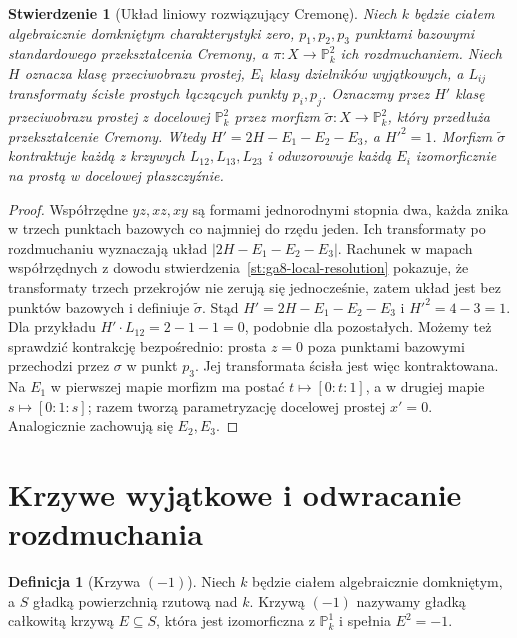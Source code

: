 \documentclass[11pt,a4paper,openany]{report}
\numberwithin{equation}{section}
\theoremstyle{plain}
\newtheorem{stwierdzenie}[twierdzenie]{Stwierdzenie}
\theoremstyle{definition}
\newtheorem{definicja}[twierdzenie]{Definicja}
\theoremstyle{remark}
\newcommand{\PP}{\mathbb P}
\begin{document}
\begin{stwierdzenie}[Układ liniowy rozwiązujący Cremonę]
\label{st:ga8-cremona-linear}
Niech $k$ będzie ciałem algebraicznie domkniętym
charakterystyki zero, $p_1,p_2,p_3$ punktami bazowymi
standardowego przekształcenia Cremony, a
$\pi:X\to\PP^2_k$ ich rozdmuchaniem. Niech $H$ oznacza
klasę przeciwobrazu prostej, $E_i$ klasy dzielników
wyjątkowych, a $L_{ij}$ transformaty ścisłe prostych
łączących punkty $p_i,p_j$. Oznaczmy przez $H'$ klasę
przeciwobrazu prostej z docelowej $\PP^2_k$ przez
morfizm $\widetilde\sigma:X\to\PP^2_k$, który przedłuża
przekształcenie Cremony. Wtedy
$H'=2H-E_1-E_2-E_3$, a $H'^2=1$.
Morfizm $\widetilde\sigma$ kontraktuje każdą z krzywych
$L_{12},L_{13},L_{23}$ i odwzorowuje każdą $E_i$
izomorficznie na prostą w docelowej płaszczyźnie.
\end{stwierdzenie}
\begin{proof}
Współrzędne $yz,xz,xy$ są formami jednorodnymi
stopnia dwa, każda znika w trzech punktach bazowych
co najmniej do rzędu jeden. Ich transformaty po
rozdmuchaniu wyznaczają układ $|2H-E_1-E_2-E_3|$.
Rachunek w mapach współrzędnych z dowodu
stwierdzenia~\ref{st:ga8-local-resolution} pokazuje,
że transformaty trzech przekrojów nie zerują się
jednocześnie, zatem układ jest bez punktów bazowych
i definiuje $\widetilde\sigma$.
Stąd $H'=2H-E_1-E_2-E_3$ i $H'^2=4-3=1$.
Dla przykładu $H'\cdot L_{12}=2-1-1=0$,
podobnie dla pozostałych. Możemy też sprawdzić
kontrakcję bezpośrednio: prosta $z=0$ poza punktami
bazowymi przechodzi przez $\sigma$ w punkt $p_3$.
Jej transformata ścisła jest więc kontraktowana.
Na $E_1$ w pierwszej mapie morfizm ma postać
$t\mapsto[0:t:1]$, a w drugiej mapie $s\mapsto[0:1:s]$;
razem tworzą parametryzację docelowej prostej $x'=0$.
Analogicznie zachowują się $E_2,E_3$.
\end{proof}

\section{Krzywe wyjątkowe i odwracanie rozdmuchania}
\label{sec:ga8-contraction}

\begin{definicja}[Krzywa $(-1)$]
\label{def:ga8-minus-one}
Niech $k$ będzie ciałem algebraicznie domkniętym,
a $S$ gładką powierzchnią rzutową nad $k$.
Krzywą $(-1)$ nazywamy gładką całkowitą krzywą
$E\subseteq S$, która jest izomorficzna z $\PP^1_k$
i spełnia $E^2=-1$.
\end{definicja}
\end{document}
